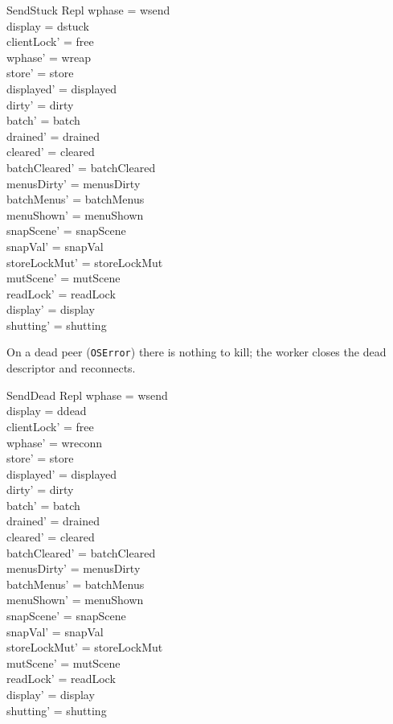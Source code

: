 \documentclass[a4paper,10pt,fleqn]{article}
\begin{document}
\begin{schema}{SendStuck}
  \Delta Repl
\where
  wphase = wsend \\
  display = dstuck \\
  clientLock' = free \\
  wphase' = wreap \\
  store' = store \\
  displayed' = displayed \\
  dirty' = dirty \\
  batch' = batch \\
  drained' = drained \\
  cleared' = cleared \\
  batchCleared' = batchCleared \\
  menusDirty' = menusDirty \\
  batchMenus' = batchMenus \\
  menuShown' = menuShown \\
  snapScene' = snapScene \\
  snapVal' = snapVal \\
  storeLockMut' = storeLockMut \\
  mutScene' = mutScene \\
  readLock' = readLock \\
  display' = display \\
  shutting' = shutting
\end{schema}

On a dead peer (\texttt{OSError}) there is nothing to kill; the worker
closes the dead descriptor and reconnects.

\begin{schema}{SendDead}
  \Delta Repl
\where
  wphase = wsend \\
  display = ddead \\
  clientLock' = free \\
  wphase' = wreconn \\
  store' = store \\
  displayed' = displayed \\
  dirty' = dirty \\
  batch' = batch \\
  drained' = drained \\
  cleared' = cleared \\
  batchCleared' = batchCleared \\
  menusDirty' = menusDirty \\
  batchMenus' = batchMenus \\
  menuShown' = menuShown \\
  snapScene' = snapScene \\
  snapVal' = snapVal \\
  storeLockMut' = storeLockMut \\
  mutScene' = mutScene \\
  readLock' = readLock \\
  display' = display \\
  shutting' = shutting
\end{schema}
\end{document}
